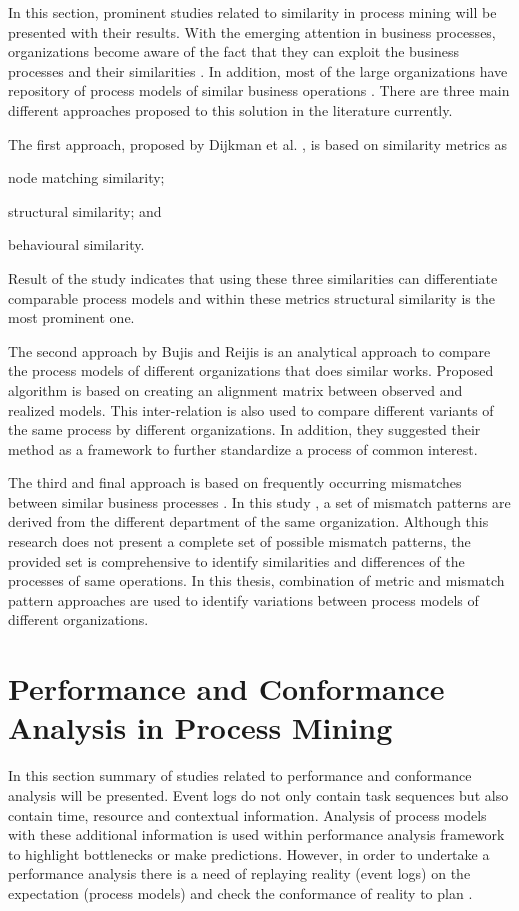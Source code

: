 In this section, prominent studies related to similarity in process mining will be presented with their results. With the emerging attention in business processes, organizations become aware of the fact that they can exploit the business processes and their similarities \cite{buijs2014comparing}. In addition, most of the large organizations have repository of process models of similar business operations \cite{dijkman2011similarity}. There are three main different approaches proposed to this solution in the literature currently. 

The first approach, proposed by Dijkman et al. \cite{dijkman2011similarity}, is based on similarity metrics as 
\begin{inparaenum}
\item node matching similarity;
\item structural similarity; and
\item behavioural similarity.
\end{inparaenum}
Result of the study \cite{dijkman2011similarity} indicates that using these three similarities can differentiate comparable process models and within these metrics structural similarity is the most prominent one. 

The second approach by Bujis and Reijis is an analytical approach \cite{buijs2014comparing} to compare the process models of different organizations that does similar works. Proposed algorithm is based on creating an alignment matrix between observed and realized models. This inter-relation is also used to compare different variants of the same process by different organizations. In addition, they suggested their method as a framework to further standardize a process of common interest. 

The third and final approach is based on frequently occurring mismatches between similar business processes \cite{dijkman2007mismatch}. In this study \cite{dijkman2007mismatch}, a set of mismatch patterns are derived from the different department of the same organization. Although this research does not present a complete set of possible mismatch patterns, the provided set is comprehensive to identify similarities and differences of the processes of same operations. In this thesis, combination of metric and mismatch pattern approaches are used to identify variations between process models of different organizations.

\section{Performance and Conformance Analysis in Process Mining}
\label{sec:performance-and-conformance-analysis-in-process-mining}
In this section summary of studies related to performance and conformance analysis will be presented. Event logs do not only contain task sequences but also contain time, resource and contextual information. Analysis of process models with these additional information is used within performance analysis framework to highlight bottlenecks or make predictions. However, in order to undertake a performance analysis there is a need of replaying reality (event logs) on the expectation (process models) and check the conformance of reality to plan \cite{van2012replaying}. 


